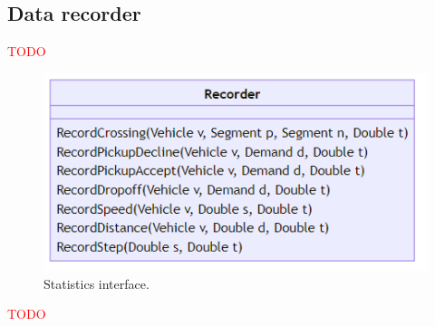 \documentclass[10pt,twocolumn]{article}
\begin{document}
\subsection{Data recorder}
\label{sec:statistics-interface}

\textcolor{red}{TODO}

\begin{figure}[!ht]
    \centering
    \includegraphics[scale=0.4]{../../diagrams/statistics/classes-v2.png}
    \caption{Statistics interface.}
    \label{fig:statistics-interface}
\end{figure}

\textcolor{red}{TODO}









\end{document}
